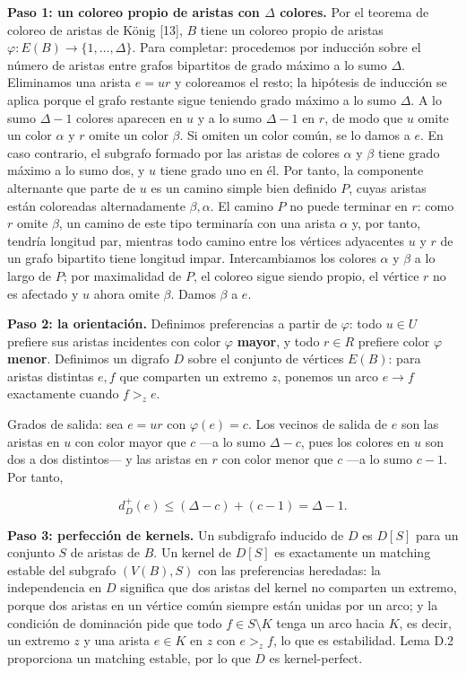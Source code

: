 \documentclass[spanish,11pt,a4paper]{article}
\begin{document}
\textbf{Paso 1: un coloreo propio de aristas con \(\Delta\) colores.}
Por el teorema de coloreo de aristas de König {[}13{]}, \(B\) tiene un
coloreo propio de aristas \(\varphi:E(B)\to\{1,\ldots,\Delta\}\). Para
completar: procedemos por inducción sobre el número de aristas entre
grafos bipartitos de grado máximo a lo sumo \(\Delta\). Eliminamos una
arista \(e=ur\) y coloreamos el resto; la hipótesis de inducción se
aplica porque el grafo restante sigue teniendo grado máximo a lo sumo
\(\Delta\). A lo sumo \(\Delta-1\) colores aparecen en \(u\) y a lo sumo
\(\Delta-1\) en \(r\), de modo que \(u\) omite un color \(\alpha\) y
\(r\) omite un color \(\beta\). Si omiten un color común, se lo damos a
\(e\). En caso contrario, el subgrafo formado por las aristas de colores
\(\alpha\) y \(\beta\) tiene grado máximo a lo sumo dos, y \(u\) tiene
grado uno en él. Por tanto, la componente alternante que parte de \(u\)
es un camino simple bien definido \(P\), cuyas aristas están coloreadas
alternadamente \(\beta,\alpha\). El camino \(P\) no puede terminar en
\(r\): como \(r\) omite \(\beta\), un camino de este tipo terminaría con
una arista \(\alpha\) y, por tanto, tendría longitud par, mientras todo
camino entre los vértices adyacentes \(u\) y \(r\) de un grafo bipartito
tiene longitud impar. Intercambiamos los colores \(\alpha\) y \(\beta\)
a lo largo de \(P\); por maximalidad de \(P\), el coloreo sigue siendo
propio, el vértice \(r\) no es afectado y \(u\) ahora omite \(\beta\).
Damos \(\beta\) a \(e\).

\textbf{Paso 2: la orientación.} Definimos preferencias a partir de
\(\varphi\): todo \(u\in U\) prefiere sus aristas incidentes con color
\(\varphi\) \textbf{mayor}, y todo \(r\in R\) prefiere color \(\varphi\)
\textbf{menor}. Definimos un digrafo \(D\) sobre el conjunto de vértices
\(E(B)\): para aristas distintas \(e,f\) que comparten un extremo \(z\),
ponemos un arco \(e\to f\) exactamente cuando \(f>_ze\).

Grados de salida: sea \(e=ur\) con \(\varphi(e)=c\). Los vecinos de
salida de \(e\) son las aristas en \(u\) con color mayor que \(c\) ---a
lo sumo \(\Delta-c\), pues los colores en \(u\) son dos a dos
distintos--- y las aristas en \(r\) con color menor que \(c\) ---a lo
sumo \(c-1\). Por tanto,

\[
d^+_D(e)\le(\Delta-c)+(c-1)=\Delta-1.
\]

\textbf{Paso 3: perfección de kernels.} Un subdigrafo inducido de \(D\)
es \(D[S]\) para un conjunto \(S\) de aristas de \(B\). Un kernel de
\(D[S]\) es exactamente un matching estable del subgrafo \((V(B),S)\)
con las preferencias heredadas: la independencia en \(D\) significa que
dos aristas del kernel no comparten un extremo, porque dos aristas en un
vértice común siempre están unidas por un arco; y la condición de
dominación pide que todo \(f\in S\setminus K\) tenga un arco hacia
\(K\), es decir, un extremo \(z\) y una arista \(e\in K\) en \(z\) con
\(e>_zf\), lo que es estabilidad. Lema D.2 proporciona un matching
estable, por lo que \(D\) es kernel-perfect.
\end{document}
